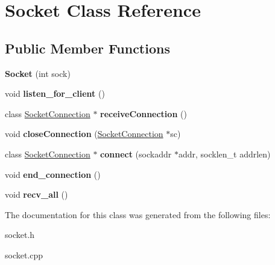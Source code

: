 \hypertarget{class_socket}{\section{Socket Class Reference}
\label{class_socket}
}
\subsection*{Public Member Functions}
\begin{DoxyCompactItemize}
\item 
\hypertarget{class_socket_acba9bcb13219372b3236ebd45edc29fb}{{\bfseries Socket} (int sock)}\label{class_socket_acba9bcb13219372b3236ebd45edc29fb}

\item 
\hypertarget{class_socket_a9409d7a46addea38d47d26ebe06bc93b}{void {\bfseries listen\-\_\-for\-\_\-client} ()}\label{class_socket_a9409d7a46addea38d47d26ebe06bc93b}

\item 
\hypertarget{class_socket_a4637d93fff9965d3c93f20d091e15ce6}{class \hyperlink{class_socket_connection}{Socket\-Connection} $\ast$ {\bfseries receive\-Connection} ()}\label{class_socket_a4637d93fff9965d3c93f20d091e15ce6}

\item 
\hypertarget{class_socket_ad9f8aabc5908fd1ba5383196e5dbb513}{void {\bfseries close\-Connection} (\hyperlink{class_socket_connection}{Socket\-Connection} $\ast$sc)}\label{class_socket_ad9f8aabc5908fd1ba5383196e5dbb513}

\item 
\hypertarget{class_socket_a5f927294fc68ee16d297ced2dd5ed7e8}{class \hyperlink{class_socket_connection}{Socket\-Connection} $\ast$ {\bfseries connect} (sockaddr $\ast$addr, socklen\-\_\-t addrlen)}\label{class_socket_a5f927294fc68ee16d297ced2dd5ed7e8}

\item 
\hypertarget{class_socket_a6c8618907b9b3395f18b9d15b4e4db03}{void {\bfseries end\-\_\-connection} ()}\label{class_socket_a6c8618907b9b3395f18b9d15b4e4db03}

\item 
\hypertarget{class_socket_a924e09899ab24fb092b94ce03e17a6af}{void {\bfseries recv\-\_\-all} ()}\label{class_socket_a924e09899ab24fb092b94ce03e17a6af}

\end{DoxyCompactItemize}


The documentation for this class was generated from the following files\-:\begin{DoxyCompactItemize}
\item 
socket.\-h\item 
socket.\-cpp\end{DoxyCompactItemize}
